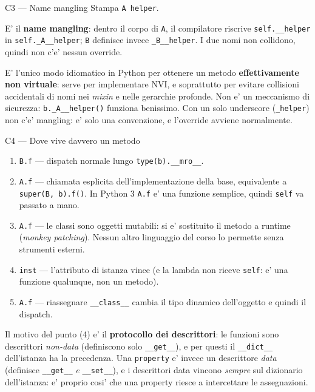 \documentclass{report}
\newcommand{\code}[1]{\texttt{\small #1}}
\newcommand{\dunder}[1]{\texttt{\small \_\_#1\_\_}}
\begin{document}
\begin{soluzione}{C3 --- Name mangling}
\label{sol:C3}
Stampa \code{A helper}.

E' il \textbf{name mangling}: dentro il corpo di \code{A}, il compilatore
riscrive \code{self.\_\_helper} in \code{self.\_A\_\_helper}; \code{B} definisce
invece \code{\_B\_\_helper}. I due nomi non collidono, quindi non c'e' nessun
override.

E' l'unico modo idiomatico in Python per ottenere un metodo
\textbf{effettivamente non virtuale}: serve per implementare NVI, e soprattutto
per evitare collisioni accidentali di nomi nei \emph{mixin} e nelle gerarchie
profonde. Non e' un meccanismo di sicurezza: \code{b.\_A\_\_helper()} funziona
benissimo. Con un solo underscore (\code{\_helper}) non c'e' mangling: e' solo
una convenzione, e l'override avviene normalmente.
\end{soluzione}

\begin{soluzione}{C4 --- Dove vive davvero un metodo}
\label{sol:C4}
\begin{enumerate}
    \item[(1)] \code{B.f} --- dispatch normale lungo \code{type(b).\_\_mro\_\_}.
    \item[(2)] \code{A.f} --- chiamata esplicita dell'implementazione della base,
          equivalente a \code{super(B, b).f()}. In Python 3 \code{A.f} e' una
          funzione semplice, quindi \code{self} va passato a mano.
    \item[(3)] \code{A.f} --- le classi sono oggetti mutabili: si e' sostituito
          il metodo a runtime (\emph{monkey patching}). Nessun altro linguaggio
          del corso lo permette senza strumenti esterni.
    \item[(4)] \code{inst} --- l'attributo di istanza vince (e la lambda non
          riceve \code{self}: e' una funzione qualunque, non un metodo).
    \item[(5)] \code{A.f} --- riassegnare \dunder{class} cambia il tipo dinamico
          dell'oggetto e quindi il dispatch.
\end{enumerate}
Il motivo del punto (4) e' il \textbf{protocollo dei descrittori}: le funzioni
sono descrittori \emph{non-data} (definiscono solo \dunder{get}), e per questi
il \code{\_\_dict\_\_} dell'istanza ha la precedenza. Una \code{property} e'
invece un descrittore \emph{data} (definisce \dunder{get} \emph{e}
\dunder{set}), e i descrittori data vincono \emph{sempre} sul dizionario
dell'istanza: e' proprio cosi' che una property riesce a intercettare le
assegnazioni.
\end{soluzione}
\end{document}

